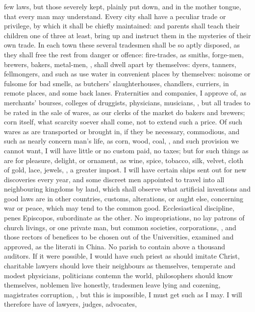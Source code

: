 {few laws, but those severely kept, plainly put down, and in the mother
tongue, that every man may understand. Every city shall have a peculiar
trade or privilege, by which it shall be chiefly maintained: and
parents shall teach their children one of three at least, bring up and
instruct them in the mysteries of their own trade. In each town these
several tradesmen shall be so aptly disposed, as they shall free the
rest from danger or offence: fire-trades, as smiths, forge-men,
brewers, bakers, metal-men, \etc{}, shall dwell apart by themselves:
dyers, tanners, fellmongers, and such as use water in convenient places
by themselves: noisome or fulsome for bad smells, as butchers'
slaughterhouses, chandlers, curriers, in remote places, and some back
lanes. Fraternities and companies, I approve of, as merchants' bourses,
colleges of druggists, physicians, musicians, \etc{}, but all trades to be
rated in the sale of wares, as our clerks of the market do bakers and
brewers; corn itself, what scarcity soever shall come, not to extend
such a price. Of such wares as are transported or brought in, if
they be necessary, commodious, and such as nearly concern man's life,
as corn, wood, coal, \etc{}, and such provision we cannot want, I will
have little or no custom paid, no taxes; but for such things as are for
pleasure, delight, or ornament, as wine, spice, tobacco, silk, velvet,
cloth of gold, lace, jewels, \etc{}, a greater impost. I will have certain
ships sent out for new discoveries every year, and some discreet
men appointed to travel into all neighbouring kingdoms by land, which
shall observe what artificial inventions and good laws are in other
countries, customs, alterations, or aught else, concerning war or
peace, which may tend to the common good. Ecclesiastical discipline,
penes Episcopos, subordinate as the other. No impropriations, no lay
patrons of church livings, or one private man, but common societies,
corporations, \etc{}, and those rectors of benefices to be chosen out of
the Universities, examined and approved, as the literati in China. No
parish to contain above a thousand auditors. If it were possible, I
would have such priest as should imitate Christ, charitable lawyers
should love their neighbours as themselves, temperate and modest
physicians, politicians contemn the world, philosophers should know
themselves, noblemen live honestly, tradesmen leave lying and cozening,
magistrates corruption, \etc{}, but this is impossible, I must get such as
I may. I will therefore have of lawyers, judges, advocates,
}
